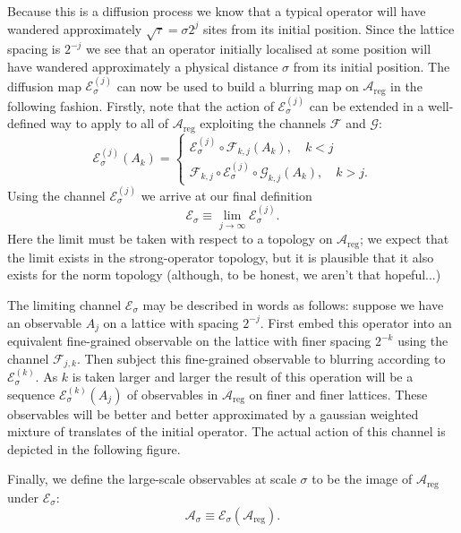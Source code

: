 \documentclass[11pt]{amsart}
\theoremstyle{plain}%
\theoremstyle{definition}
\theoremstyle{remark}
\begin{document}
Because this is a diffusion process we know that a typical operator will have wandered approximately $\sqrt{\tau} = \sigma 2^j$ sites from its initial position. Since the lattice spacing is $2^{-j}$ we see that an operator initially localised at some position will have wandered approximately a physical distance $\sigma$ from its initial position. The diffusion map $\mathcal{E}_\sigma^{(j)}$ can now be used to build a blurring map on $\mathcal{A}_{\text{reg}}$ in the following fashion. Firstly, note that the action of $\mathcal{E}_\sigma^{(j)}$ can be extended in a well-defined way to apply to all of $\mathcal{A}_{\text{reg}}$ exploiting the channels $\mathcal{F}$ and $\mathcal{G}$:
\begin{equation}
	\mathcal{E}_\sigma^{(j)}(A_k) = \begin{cases} \mathcal{E}_\sigma^{(j)}\circ\mathcal{F}_{k,j}(A_k), \quad k < j \\
	\mathcal{F}_{k,j}\circ\mathcal{E}_\sigma^{(j)}\circ\mathcal{G}_{k,j}(A_k), \quad k > j. \end{cases}
\end{equation}
Using the channel $\mathcal{E}_\sigma^{(j)}$ we arrive at our final definition
\begin{equation}
	\mathcal{E}_\sigma \equiv \lim_{j\rightarrow \infty} \mathcal{E}_\sigma^{(j)}.
\end{equation}
Here the limit must be taken with respect to a topology on $\mathcal{A}_{\text{reg}}$; we expect that the limit exists in the strong-operator topology, but it is plausible that it also exists for the norm topology (although, to be honest, we aren't that hopeful...) 

The limiting channel $\mathcal{E}_\sigma$ may be described in words as follows: suppose we have an observable $A_j$ on a lattice with spacing $2^{-j}$. First embed this operator into an equivalent fine-grained observable on the lattice with finer spacing $2^{-k}$ using the channel $\mathcal{F}_{j,k}$. Then subject this fine-grained observable to blurring according to $\mathcal{E}_\sigma^{(k)}$. As $k$ is taken larger and larger the result of this operation will be a sequence $\mathcal{E}_\sigma^{(k)}(A_j)$ of observables in $\mathcal{A}_{\text{reg}}$ on finer and finer lattices. These observables will be better and better approximated by a gaussian weighted mixture of translates of the initial operator. The actual action of this channel is depicted in the following figure. 

Finally, we define the large-scale observables at scale $\sigma$ to be the image of $\mathcal{A}_{\text{reg}}$ under $\mathcal{E}_\sigma$:
\begin{equation}
	\mathcal{A}_\sigma \equiv \mathcal{E}_\sigma(\mathcal{A}_{\text{reg}}).
\end{equation}
\end{document}
